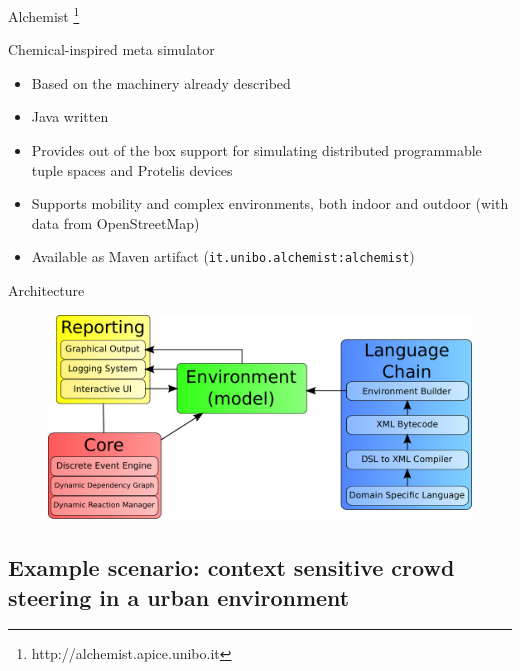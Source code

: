 \documentclass[presentation]{beamer} %
\begin{document}
\begin{frame}{Alchemist \footnote{http://alchemist.apice.unibo.it}}
  \begin{block}{Chemical-inspired meta simulator}
    \begin{itemize}
      \item Based on the machinery already described
      \item Java written
      \item Provides out of the box support for simulating distributed programmable tuple spaces and Protelis \cite{protelis} devices
      \item Supports mobility and complex environments, both indoor and outdoor (with data from OpenStreetMap)
      \item Available as Maven artifact (\texttt{it.unibo.alchemist:alchemist})
    \end{itemize}
  \end{block}
\end{frame}

\begin{frame}{Architecture}
  \begin{figure}
    \includegraphics[width=\textwidth]{imgs/architecture} 
  \end{figure}
\end{frame}


\subsection{Example scenario: context sensitive crowd steering in a urban environment}
\end{document}

